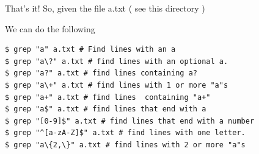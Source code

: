 \documentclass[10pt]{article}
\begin{document}
That's it! So, given the file a.txt ( see this directory )

We can do the following

\begin{lstlisting}[style=term]
$ grep "a" a.txt # Find lines with an a
$ grep "a\?" a.txt # find lines with an optional a.
$ grep "a?" a.txt # find lines containing a?
$ grep "a\+" a.txt # find lines with 1 or more "a"s
$ grep "a+" a.txt # find lines  containing "a+" 
$ grep "a$" a.txt # find lines that end with a
$ grep "[0-9]$" a.txt # find lines that end with a number
$ grep "^[a-zA-Z]$" a.txt # find lines with one letter.
$ grep "a\{2,\}" a.txt # find lines with 2 or more "a"s
\end{lstlisting}
\end{document}
